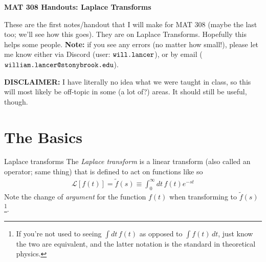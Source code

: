 \documentclass[11pt]{article}
\newcommand{\bigtitle}[1]{
    \begin{center}
    \huge \textbf{#1}
    \end{center}
}
\theoremstyle{mystyle}
\begin{document}
\bigtitle{MAT 308 Handouts: Laplace Transforms}

\noin
These are the first notes/handout that I will make for
MAT 308 (maybe the last too; we'll see how this goes).
They are on Laplace Transforms. Hopefully this helps
some people.
\textbf{Note:} if you see any errors (no
matter how small!), please let me know either via Discord
(user: $\verb|will.lancer|$), or by email ($\verb|william.lancer@stonybrook.edu|$).

\noin
\textbf{DISCLAIMER:} I have literally no idea what we
were taught in class, so this will most likely be off-topic
in some (a lot of?) areas. It should still be useful, though.

\section{The Basics}

\begin{psidea}{Laplace transforms}{}
    The \emph{Laplace transform} is a linear transform (also
    called an operator; same thing)
    that is defined to act on functions like so
    \begin{align*}
        \mathcal{L}[f(t)] = \tilde{f}(s) \equiv \int_0^\infty dt \, f(t) e^{-st}
    \end{align*}
    Note the change of \emph{argument} for the function $f(t)$
    when transforming to $\tilde{f}(s)$\footnote{If you're
    not used to seeing $\int dt \, f(t)$ as opposed
    to $\int f(t) \, dt$, just know the two are equivalent,
    and the latter notation is the standard in theoretical
    physics.}.
\end{psidea}
\end{document}
